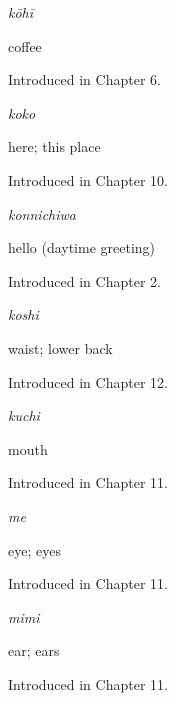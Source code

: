 \noindent\begin{minipage}[t]{\linewidth}
\raggedright
\textbf{}\enspace\emph{kōhī}\par
\small coffee\par
\footnotesize Introduced in Chapter 6.
\end{minipage}\par\medskip

\noindent\begin{minipage}[t]{\linewidth}
\raggedright
\textbf{}\enspace\emph{koko}\par
\small here; this place\par
\footnotesize Introduced in Chapter 10.
\end{minipage}\par\medskip

\noindent\begin{minipage}[t]{\linewidth}
\raggedright
\textbf{}\enspace\emph{konnichiwa}\par
\small hello (daytime greeting)\par
\footnotesize Introduced in Chapter 2.
\end{minipage}\par\medskip

\noindent\begin{minipage}[t]{\linewidth}
\raggedright
\textbf{}\enspace\emph{koshi}\par
\small waist; lower back\par
\footnotesize Introduced in Chapter 12.
\end{minipage}\par\medskip

\noindent\begin{minipage}[t]{\linewidth}
\raggedright
\textbf{}\enspace\emph{kuchi}\par
\small mouth\par
\footnotesize Introduced in Chapter 11.
\end{minipage}\par\medskip

\noindent\begin{minipage}[t]{\linewidth}
\raggedright
\textbf{}\enspace\emph{me}\par
\small eye; eyes\par
\footnotesize Introduced in Chapter 11.
\end{minipage}\par\medskip

\noindent\begin{minipage}[t]{\linewidth}
\raggedright
\textbf{}\enspace\emph{mimi}\par
\small ear; ears\par
\footnotesize Introduced in Chapter 11.
\end{minipage}\par\medskip

